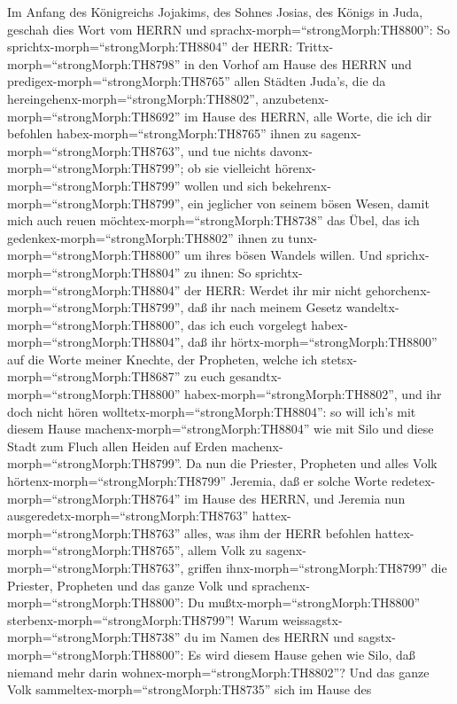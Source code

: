 Im Anfang des Königreichs Jojakims, des Sohnes Josias, des
Königs in Juda, geschah dies Wort vom HERRN und
sprachx-morph=``strongMorph:TH8800'':  So
sprichtx-morph=``strongMorph:TH8804'' der HERR:
Trittx-morph=``strongMorph:TH8798'' in den Vorhof am Hause des HERRN und
predigex-morph=``strongMorph:TH8765'' allen Städten Juda's, die da
hereingehenx-morph=``strongMorph:TH8802'',
anzubetenx-morph=``strongMorph:TH8692'' im Hause des HERRN, alle Worte,
die ich dir befohlen habex-morph=``strongMorph:TH8765'' ihnen zu
sagenx-morph=``strongMorph:TH8763'', und tue nichts
davonx-morph=``strongMorph:TH8799'';  ob sie vielleicht
hörenx-morph=``strongMorph:TH8799'' wollen und sich
bekehrenx-morph=``strongMorph:TH8799'', ein jeglicher von seinem bösen
Wesen, damit mich auch reuen möchtex-morph=``strongMorph:TH8738'' das
Übel, das ich gedenkex-morph=``strongMorph:TH8802'' ihnen zu
tunx-morph=``strongMorph:TH8800'' um ihres bösen Wandels willen.
 Und sprichx-morph=``strongMorph:TH8804'' zu ihnen: So
sprichtx-morph=``strongMorph:TH8804'' der HERR: Werdet ihr mir nicht
gehorchenx-morph=``strongMorph:TH8799'', daß ihr nach meinem Gesetz
wandeltx-morph=``strongMorph:TH8800'', das ich euch vorgelegt
habex-morph=``strongMorph:TH8804'',  daß ihr
hörtx-morph=``strongMorph:TH8800'' auf die Worte meiner Knechte, der
Propheten, welche ich stetsx-morph=``strongMorph:TH8687'' zu euch
gesandtx-morph=``strongMorph:TH8800''
habex-morph=``strongMorph:TH8802'', und ihr doch nicht hören
wolltetx-morph=``strongMorph:TH8804'':  so will ich's mit
diesem Hause machenx-morph=``strongMorph:TH8804'' wie mit Silo und diese
Stadt zum Fluch allen Heiden auf Erden
machenx-morph=``strongMorph:TH8799''.  Da nun die Priester,
Propheten und alles Volk hörtenx-morph=``strongMorph:TH8799'' Jeremia,
daß er solche Worte redetex-morph=``strongMorph:TH8764'' im Hause des
HERRN,  und Jeremia nun
ausgeredetx-morph=``strongMorph:TH8763''
hattex-morph=``strongMorph:TH8763'' alles, was ihm der HERR befohlen
hattex-morph=``strongMorph:TH8765'', allem Volk zu
sagenx-morph=``strongMorph:TH8763'', griffen
ihnx-morph=``strongMorph:TH8799'' die Priester, Propheten und das ganze
Volk und sprachenx-morph=``strongMorph:TH8800'': Du
mußtx-morph=``strongMorph:TH8800''
sterbenx-morph=``strongMorph:TH8799''!  Warum
weissagstx-morph=``strongMorph:TH8738'' du im Namen des HERRN und
sagstx-morph=``strongMorph:TH8800'': Es wird diesem Hause gehen wie
Silo, daß niemand mehr darin wohnex-morph=``strongMorph:TH8802''? Und
das ganze Volk sammeltex-morph=``strongMorph:TH8735'' sich im Hause des
